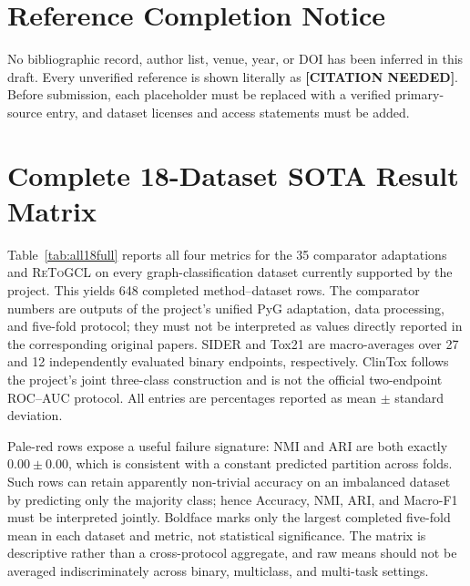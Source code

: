 \documentclass[10pt,twocolumn]{article}
\newcommand{\method}{\textsc{ReToGCL}}
\newcommand{\citeneeded}{\textbf{[CITATION NEEDED]}}
\begin{document}
\section*{Reference Completion Notice}

No bibliographic record, author list, venue, year, or DOI has been inferred in this draft. Every unverified reference is shown literally as \citeneeded. Before submission, each placeholder must be replaced with a verified primary-source entry, and dataset licenses and access statements must be added.

\clearpage
\onecolumn
\section{Complete 18-Dataset SOTA Result Matrix}
\label{sec:all18results}

Table~\ref{tab:all18full} reports all four metrics for the 35 comparator adaptations and \method{} on every graph-classification dataset currently supported by the project. This yields 648 completed method--dataset rows. The comparator numbers are outputs of the project's unified PyG adaptation, data processing, and five-fold protocol; they must not be interpreted as values directly reported in the corresponding original papers. SIDER and Tox21 are macro-averages over 27 and 12 independently evaluated binary endpoints, respectively. ClinTox follows the project's joint three-class construction and is not the official two-endpoint ROC--AUC protocol. All entries are percentages reported as mean $\pm$ standard deviation.

Pale-red rows expose a useful failure signature: NMI and ARI are both exactly $0.00\pm0.00$, which is consistent with a constant predicted partition across folds. Such rows can retain apparently non-trivial accuracy on an imbalanced dataset by predicting only the majority class; hence Accuracy, NMI, ARI, and Macro-F1 must be interpreted jointly. Boldface marks only the largest completed five-fold mean in each dataset and metric, not statistical significance. The matrix is descriptive rather than a cross-protocol aggregate, and raw means should not be averaged indiscriminately across binary, multiclass, and multi-task settings.


\end{document}

